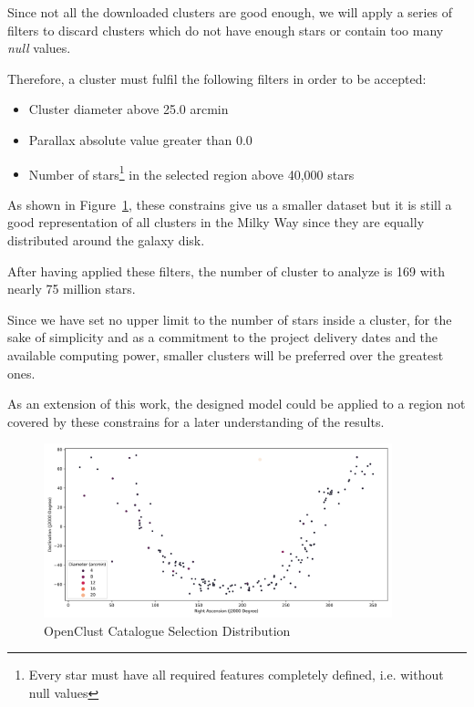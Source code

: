 \documentclass[11pt, a4paper, english]{book}
\begin{document}
Since not all the downloaded clusters are good enough,
we will apply a series of filters to discard clusters which do not have enough stars
or contain too many \emph{null} values.

Therefore, a cluster must fulfil the following filters in order to be accepted:

\begin{itemize}
  \item Cluster diameter above 25.0 arcmin
  \item Parallax absolute value greater than 0.0
  \item Number of stars\footnote{Every star must have all required features completely defined, i.e. without null values}
        in the selected region above 40,000 stars
\end{itemize}

As shown in Figure~\ref{fig:OpenClustSelection},
these constrains give us a smaller dataset but it is still a good representation of all clusters in the Milky Way
since they are equally distributed around the galaxy disk.

After having applied these filters, the number of cluster to analyze is 169 with nearly 75 million stars.

Since we have set no upper limit to the number of stars inside a cluster,
for the sake of simplicity and as a commitment to the project delivery dates
and the available computing power, smaller clusters will be preferred over the greatest ones.

As an extension of this work, the designed model could be applied to a region not covered by these constrains
for a later understanding of the results.

\begin{figure}[htbp]
  \centering
  \includegraphics[width=0.9\textwidth]{../figures/cluster_selection_tier1.png}
  \caption{OpenClust Catalogue Selection Distribution}
  \label{fig:OpenClustSelection}
\end{figure}
\end{document}

